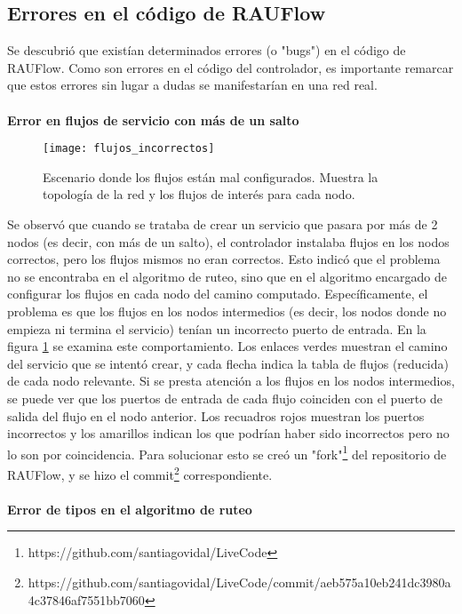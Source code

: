 \subsection{Errores en el código de RAUFlow}
Se descubrió que existían determinados errores (o "bugs") en el código de RAUFlow. Como son errores en el código del controlador, es importante remarcar que estos errores sin lugar a dudas se manifestarían en una red real. \\ \\
\textbf{Error en flujos de servicio con más de un salto} \\
\begin{figure}[t]
	\caption{Escenario donde los flujos están mal configurados. Muestra la topología de la red y los flujos de interés para cada nodo.}
	\texttt{[image: flujos\_incorrectos]}
	\centering
	\label{fig:flujos_incorrectos}
\end{figure}
Se observó que cuando se trataba de crear un servicio que pasara por más de 2 nodos (es decir, con más de un salto), el controlador instalaba flujos en los nodos correctos, pero los flujos mismos no eran correctos. Esto indicó que el problema no se encontraba en el algoritmo de ruteo, sino que en el algoritmo encargado de configurar los flujos en cada nodo del camino computado. Específicamente, el problema es que los flujos en los nodos intermedios (es decir, los nodos donde no empieza ni termina el servicio) tenían un incorrecto puerto de entrada. En la figura \ref{fig:flujos_incorrectos} se examina este comportamiento. Los enlaces verdes muestran el camino del servicio que se intentó crear, y cada flecha indica la tabla de flujos (reducida) de cada nodo relevante. Si se presta atención a los flujos en los nodos intermedios, se puede ver que los puertos de entrada de cada flujo coinciden con el puerto de salida del flujo en el nodo anterior. Los recuadros rojos muestran los puertos incorrectos y los amarillos indican los que podrían haber sido incorrectos pero no lo son por coincidencia.
Para solucionar esto se creó un "fork"\footnote{https://github.com/santiagovidal/LiveCode} del repositorio de RAUFlow, y se hizo el commit\footnote{https://github.com/santiagovidal/LiveCode/commit/aeb575a10eb241dc3980a4c37846af7551bb7060} correspondiente. \\ \\
\textbf{Error de tipos en el algoritmo de ruteo} \\
